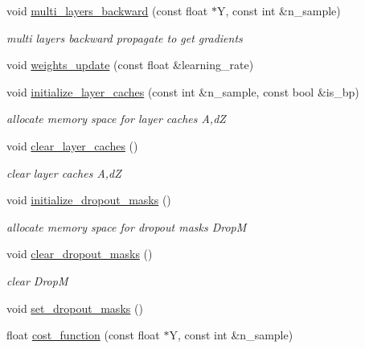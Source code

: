 \begin{DoxyCompactItemize}
\mbox{\label{classdnn_aeea24db0c4f09f7697ad6c5881d1aabb}} 
void \hyperlink{classdnn_aeea24db0c4f09f7697ad6c5881d1aabb}{multi\+\_\+layers\+\_\+backward} (const float $\ast$Y, const int \&n\+\_\+sample)
\begin{DoxyCompactList}\small\item\em multi layers backward propagate to get gradients \end{DoxyCompactList}\item 
void \hyperlink{classdnn_a8cf7454d21ad0b081e7f2b18619ed2cd}{weights\+\_\+update} (const float \&learning\+\_\+rate)
\item 
\mbox{\label{classdnn_a428a2e13de6a707c98ed6506480dd6e5}} 
void \hyperlink{classdnn_a428a2e13de6a707c98ed6506480dd6e5}{initialize\+\_\+layer\+\_\+caches} (const int \&n\+\_\+sample, const bool \&is\+\_\+bp)
\begin{DoxyCompactList}\small\item\em allocate memory space for layer caches A,dZ \end{DoxyCompactList}\item 
\mbox{\label{classdnn_a177251ed1f2ed2fb94d061938aad030e}} 
void \hyperlink{classdnn_a177251ed1f2ed2fb94d061938aad030e}{clear\+\_\+layer\+\_\+caches} ()
\begin{DoxyCompactList}\small\item\em clear layer caches A,dZ \end{DoxyCompactList}\item 
\mbox{\label{classdnn_ac75b380bdca4f7eb811a97db1dd499bb}} 
void \hyperlink{classdnn_ac75b380bdca4f7eb811a97db1dd499bb}{initialize\+\_\+dropout\+\_\+masks} ()
\begin{DoxyCompactList}\small\item\em allocate memory space for dropout masks DropM \end{DoxyCompactList}\item 
\mbox{\label{classdnn_a4fdc890e9dcc625e7474b1f3b4a0e7fb}} 
void \hyperlink{classdnn_a4fdc890e9dcc625e7474b1f3b4a0e7fb}{clear\+\_\+dropout\+\_\+masks} ()
\begin{DoxyCompactList}\small\item\em clear DropM \end{DoxyCompactList}\item 
void \hyperlink{classdnn_a3b76e71899549d8b493ebba21e57816a}{set\+\_\+dropout\+\_\+masks} ()
\item 
float \hyperlink{classdnn_a90021be0d55ab9b68b283d39eac19818}{cost\+\_\+function} (const float $\ast$Y, const int \&n\+\_\+sample)
\end{DoxyCompactItemize}


